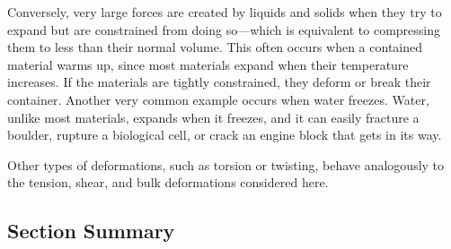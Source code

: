 \documentclass[
]{book}
\begin{document}
Conversely, very large forces are created by liquids and solids when
they try to expand but are constrained from doing so---which is
equivalent to compressing them to less than their normal volume. This
often occurs when a contained material warms up, since most materials
expand when their temperature increases. If the materials are tightly
constrained, they deform or break their container. Another very common
example occurs when water freezes. Water, unlike most materials, expands
when it freezes, and it can easily fracture a boulder, rupture a
biological cell, or crack an engine block that gets in its way.

Other types of deformations, such as torsion or twisting, behave
analogously to the tension, shear, and bulk deformations considered
here.

\hypertarget{fs-id1165298595602-summary}{}
\hypertarget{section-summary-16}{%
\subsection{Section Summary}\label{section-summary-16}}
\end{document}

